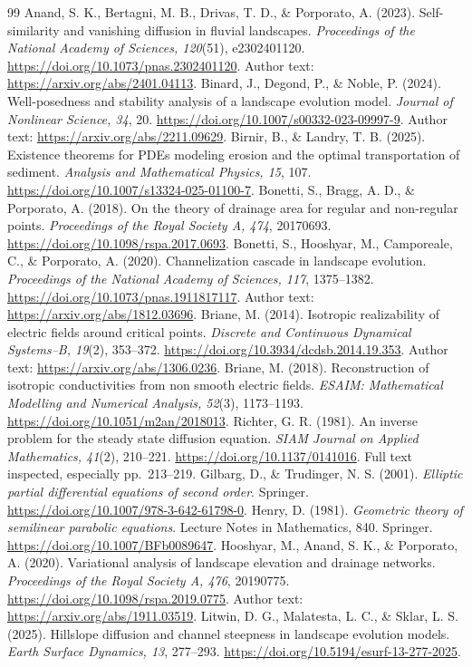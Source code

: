 \documentclass[11pt,a4paper]{article}
\theoremstyle{definition}\newtheorem{definition}[theorem]{Definition}
\theoremstyle{remark}\newtheorem{remark}[theorem]{Remark}
\begin{document}
\begin{thebibliography}{99}
 Anand, S. K., Bertagni, M. B., Drivas, T. D., \& Porporato, A. (2023). Self-similarity and vanishing diffusion in fluvial landscapes. \emph{Proceedings of the National Academy of Sciences, 120}(51), e2302401120. \url{https://doi.org/10.1073/pnas.2302401120}. Author text: \url{https://arxiv.org/abs/2401.04113}.
 Binard, J., Degond, P., \& Noble, P. (2024). Well-posedness and stability analysis of a landscape evolution model. \emph{Journal of Nonlinear Science, 34}, 20. \url{https://doi.org/10.1007/s00332-023-09997-9}. Author text: \url{https://arxiv.org/abs/2211.09629}.
 Birnir, B., \& Landry, T. B. (2025). Existence theorems for PDEs modeling erosion and the optimal transportation of sediment. \emph{Analysis and Mathematical Physics, 15}, 107. \url{https://doi.org/10.1007/s13324-025-01100-7}.
 Bonetti, S., Bragg, A. D., \& Porporato, A. (2018). On the theory of drainage area for regular and non-regular points. \emph{Proceedings of the Royal Society A, 474}, 20170693. \url{https://doi.org/10.1098/rspa.2017.0693}.
 Bonetti, S., Hooshyar, M., Camporeale, C., \& Porporato, A. (2020). Channelization cascade in landscape evolution. \emph{Proceedings of the National Academy of Sciences, 117}, 1375--1382. \url{https://doi.org/10.1073/pnas.1911817117}. Author text: \url{https://arxiv.org/abs/1812.03696}.
 Briane, M. (2014). Isotropic realizability of electric fields around critical points. \emph{Discrete and Continuous Dynamical Systems--B, 19}(2), 353--372. \url{https://doi.org/10.3934/dcdsb.2014.19.353}. Author text: \url{https://arxiv.org/abs/1306.0236}.
 Briane, M. (2018). Reconstruction of isotropic conductivities from non smooth electric fields. \emph{ESAIM: Mathematical Modelling and Numerical Analysis, 52}(3), 1173--1193. \url{https://doi.org/10.1051/m2an/2018013}.
 Richter, G. R. (1981). An inverse problem for the steady state diffusion equation. \emph{SIAM Journal on Applied Mathematics, 41}(2), 210--221. \url{https://doi.org/10.1137/0141016}. Full text inspected, especially pp.~213--219.
 Gilbarg, D., \& Trudinger, N. S. (2001). \emph{Elliptic partial differential equations of second order}. Springer. \url{https://doi.org/10.1007/978-3-642-61798-0}.
 Henry, D. (1981). \emph{Geometric theory of semilinear parabolic equations}. Lecture Notes in Mathematics, 840. Springer. \url{https://doi.org/10.1007/BFb0089647}.
 Hooshyar, M., Anand, S. K., \& Porporato, A. (2020). Variational analysis of landscape elevation and drainage networks. \emph{Proceedings of the Royal Society A, 476}, 20190775. \url{https://doi.org/10.1098/rspa.2019.0775}. Author text: \url{https://arxiv.org/abs/1911.03519}.
 Litwin, D. G., Malatesta, L. C., \& Sklar, L. S. (2025). Hillslope diffusion and channel steepness in landscape evolution models. \emph{Earth Surface Dynamics, 13}, 277--293. \url{https://doi.org/10.5194/esurf-13-277-2025}.
\end{thebibliography}
\end{document}
